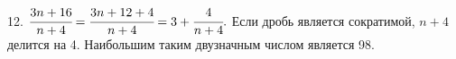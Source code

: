 12. $\cfrac{3n+16}{n+4}=\cfrac{3n+12+4}{n+4}=3+\cfrac{4}{n+4}.$ Если дробь является сократимой, $n+4$ делится на 4. Наибольшим таким двузначным числом является 98.\\
